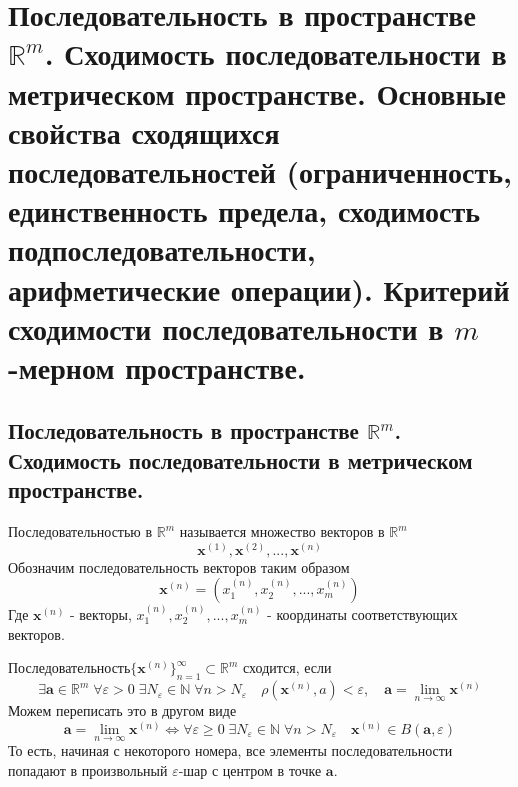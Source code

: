 \section{Последовательность в пространстве $\mathbb {R}^m$. Сходимость последовательности в метрическом пространстве. Основные свойства сходящихся последовательностей (ограниченность, единственность предела, сходимость подпоследовательности, арифметические операции). Критерий сходимости последовательности в $m$-мерном пространстве.}
\subsection{Последовательность в пространстве $\mathbb {R}^m$. Сходимость последовательности в метрическом пространстве.}
Последовательностью в $\mathbb {R}^m$ называется множество векторов в $\mathbb {R}^m$
$$
\textbf{x}^{(1)}, \textbf{x}^{(2)}, ..., \textbf{x}^{(n)}
$$
Обозначим последовательность векторов таким образом 
$$ \textbf{x}^{(n)} = (x^{(n)}_1, x^{(n)}_2, ..., x^{(n)}_m)$$
Где $\textbf{x}^{(n)}$ - векторы, $x^{(n)}_1, x^{(n)}_2, ..., x^{(n)}_m$ - координаты соответствующих векторов.

Последовательность$\{\textbf{x}^{(n)}\}^{\infty}_{n=1} \subset \mathbb {R}^m$ сходится, если 
$$
\exists \textbf {a} \in \mathbb {R}^m \; \forall \varepsilon > 0 \; \exists N_{\varepsilon} \in \mathbb {N} \; \forall n > N_{\varepsilon} \quad \rho(\textbf{x}^{(n)}, a) < {\varepsilon}, \quad \textbf {a} = \lim_{n\to\infty}{\textbf{x}^{(n)}}
$$
Можем переписать это в другом виде 
$$
\textbf {a} = \lim_{n\to\infty}{\textbf{x}^{(n)}} \Leftrightarrow \forall \varepsilon \geq 0 \; \exists N_{\varepsilon} \in \mathbb {N} \; \forall n > N_{\varepsilon} \quad \textbf{x}^{(n)} \in B(\textbf {a}, \varepsilon)
$$
То есть, начиная с некоторого номера, все элементы последовательности попадают в произвольный $\varepsilon$-шар с центром в точке $\textbf {a}$.
